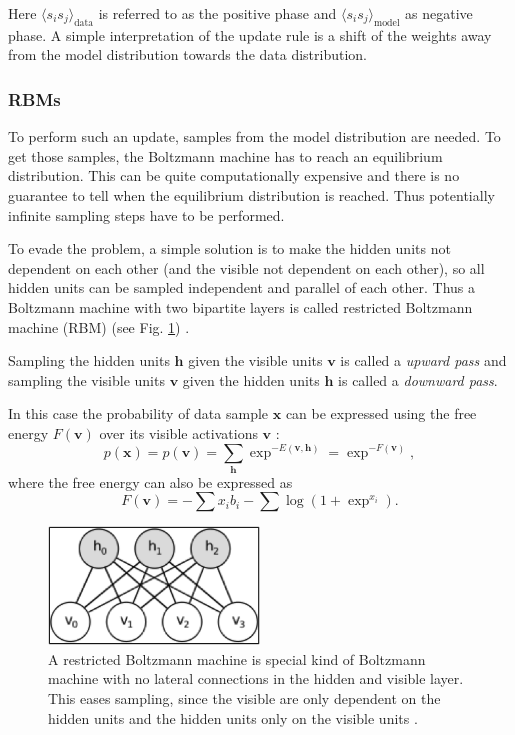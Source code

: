 Here $\langle s_i s_j \rangle_{\text{data}}$ is referred to as the positive phase and $ \langle s_i s_j \rangle_{\text{model}}$ as negative phase.
A simple interpretation of the update rule is a shift of the weights away from the model distribution towards the data distribution.

\subsubsection{RBMs}

To perform such an update, samples from the model distribution are needed. 
To get those samples, the Boltzmann machine has to reach an equilibrium distribution. 
This can be quite computationally expensive and there is no guarantee to tell when the equilibrium distribution is reached.
Thus potentially infinite sampling steps have to be performed.

To evade the problem, a simple solution is to make the hidden units not dependent on each other (and the visible not dependent on each other), so all hidden units can be sampled independent and parallel of each other.
Thus a Boltzmann machine with two bipartite layers is called restricted Boltzmann machine (RBM) (see Fig. \ref{fig:rbm}) \cite{smolensky1986information}.

Sampling the hidden units $\textbf{h}$ given the visible units $\textbf{v}$ is called a \textit{upward pass} and sampling the visible units $\textbf{v}$ given the hidden units $\textbf{h}$ is called a \textit{downward pass}.

In this case the probability of data sample $\textbf{x}$ can be expressed using the free energy $F(\textbf{v})$ over its visible activations $\textbf{v}$ \cite{hinton2010practical}\cite{Fischer2014}:
\[
p(\textbf{x}) =  p(\textbf{v}) = \sum_{\textbf{h}} \exp^{-E(\textbf{v},\textbf{h})} = \exp^{-F(\textbf{v})},
\]
where the free energy can also be expressed as
\[
F(\textbf{v}) = - \sum x_i b_i - \sum \log(1 + \exp^{x_i})  .
\]

\begin{figure}
	\centering
    	\includegraphics[width=0.5\textwidth]{imgs/rbm.png} 
    \caption{A restricted Boltzmann machine is special kind of Boltzmann machine with no lateral connections in the hidden and visible layer. This eases sampling, since the visible are only dependent on the hidden units and the hidden units only on the visible units \cite{rbmImg}.}
	\label{fig:rbm}
\end{figure}

